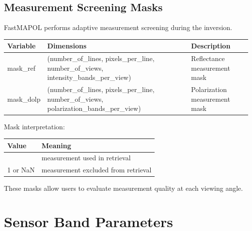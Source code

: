 \documentclass[
  11pt,
  letterpaper,
  DIV=11,
  numbers=noendperiod]{scrreprt}
\begin{document}
\subsection{Measurement Screening
Masks}\label{measurement-screening-masks}

FastMAPOL performs adaptive measurement screening during the inversion.

\begin{longtable}[]{@{}
  >{\raggedright\arraybackslash}p{}
  >{\raggedright\arraybackslash}p{}
  >{\raggedright\arraybackslash}p{}@{}}
\toprule\noalign{}
\begin{minipage}[b]{\linewidth}\raggedright
Variable
\end{minipage} & \begin{minipage}[b]{\linewidth}\raggedright
Dimensions
\end{minipage} & \begin{minipage}[b]{\linewidth}\raggedright
Description
\end{minipage} \\
\midrule\noalign{}
\endhead
\bottomrule\noalign{}
\endlastfoot
mask\_ref & (number\_of\_lines, pixels\_per\_line, number\_of\_views,
intensity\_bands\_per\_view) & Reflectance measurement mask \\
mask\_dolp & (number\_of\_lines, pixels\_per\_line, number\_of\_views,
polarization\_bands\_per\_view) & Polarization measurement mask \\
\end{longtable}

Mask interpretation:

\begin{longtable}[]{@{}ll@{}}
\toprule\noalign{}
Value & Meaning \\
\midrule\noalign{}
\endhead
\bottomrule\noalign{}
\endlastfoot
0 & measurement used in retrieval \\
1 or NaN & measurement excluded from retrieval \\
\end{longtable}

These masks allow users to evaluate measurement quality at each viewing
angle.

\section{Sensor Band Parameters}\label{sensor-band-parameters}
\end{document}

